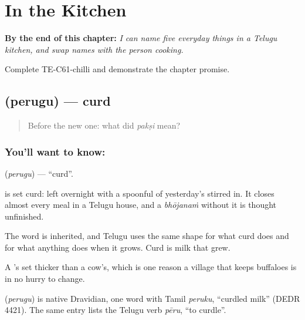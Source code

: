 
\chapter{In the Kitchen}
\label{ch:te-kitchen}

\begin{chapteropening}
\textbf{By the end of this chapter:} \emph{I can name five everyday things in a Telugu kitchen, and swap names with the person cooking.}

Complete TE-C61-chilli and demonstrate the chapter promise.
\end{chapteropening}

\section[\texorpdfstring{\te{పెరుగు} (perugu)}{పెరుగు (perugu)}]{ (perugu) — curd}

\label{lesson:TE-C61-curd}



\begin{quote}
Before the new one: what did \emph{pakṣi} mean?
\end{quote}

\subsection*{You'll want to know: }
\textbf{} (\emph{perugu}) — \textquotedblleft{}curd\textquotedblright{}.

 is set curd:  left overnight with a spoonful of yesterday's  stirred in. It closes almost every meal in a Telugu house, and a \emph{bhōjanaṁ} without it is thought unfinished.

The word is inherited, and Telugu uses the same shape for what curd does and for what anything does when it grows. Curd is milk that grew.

A 's  set thicker than a cow's, which is one reason a village that keeps buffaloes is in no hurry to change.

\begin{cousinweb}
\textbf{} (\emph{perugu}) is native Dravidian, one word with Tamil \emph{peruku}, \textquotedblleft{}curdled milk\textquotedblright{} (DEDR 4421). The same entry lists the Telugu verb \emph{pēru}, \textquotedblleft{}to curdle\textquotedblright{}.
\end{cousinweb}

